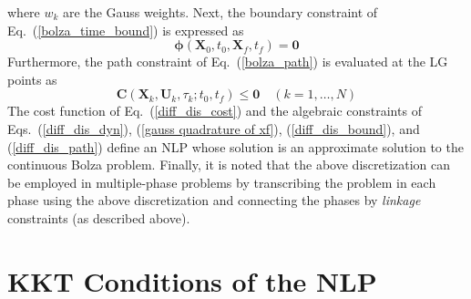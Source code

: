 \documentclass[10pt,final]{report}
\begin{document}
where $w_k$ are the Gauss weights.  Next, the
boundary constraint of Eq.~(\ref{bolza_time_bound}) is expressed as
\begin{equation}\label{diff_dis_bound}
  \boldsymbol{\phi}(\textbf{X}_0,t_0,\textbf{X}_f,t_f) =
  \textbf{0}
\end{equation}
Furthermore, the path constraint of Eq.~(\ref{bolza_path}) is
evaluated at the LG points as
\begin{equation}\label{diff_dis_path}
  \textbf{C}(\textbf{X}_k,\textbf{U}_k,\tau_k;t_0,t_f) \leq
  \textbf{0} \quad (k = 1,\ldots,N)
\end{equation}
The cost function of Eq.~(\ref{diff_dis_cost}) and the algebraic
constraints of Eqs.~(\ref{diff_dis_dyn}),
(\ref{gauss quadrature of xf}), (\ref{diff_dis_bound}), and
(\ref{diff_dis_path}) define an NLP whose solution is an approximate
solution to the continuous Bolza problem.  Finally, it is noted that the above
discretization can be employed in multiple-phase problems by transcribing the
problem in each phase using the above discretization and connecting the phases
by {\em linkage} constraints (as described above).

\section{KKT Conditions of the NLP\label{KKT Disc Cond}}
\end{document}
